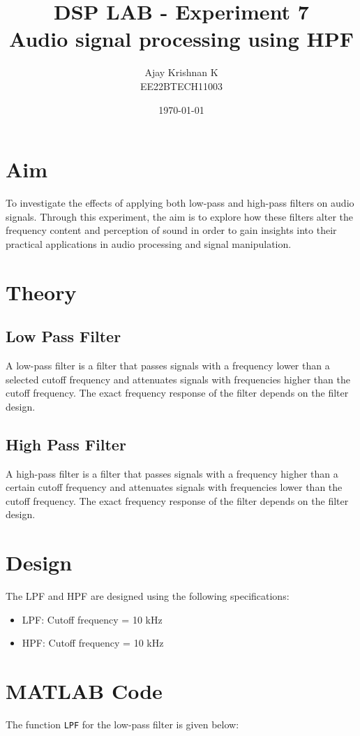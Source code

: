 \documentclass[a4paper,12pt]{article}
\title{\textbf{DSP LAB - Experiment 7} \\
        \vspace*{0.3em}
        \large{Audio signal processing using HPF} \\}
\author{Ajay Krishnan K \\  EE22BTECH11003}
\date{\today}
\begin{document}
\maketitle

\section*{Aim}
To investigate the effects of applying both low-pass and high-pass
filters on audio signals. Through this experiment, the aim is to
explore how these filters alter the frequency content
and perception of sound in order to gain insights into their
practical applications in audio processing and signal manipulation.

\section*{Theory}
\subsection*{Low Pass Filter}
A low-pass filter is a filter that passes signals with a frequency lower than a selected cutoff frequency and attenuates signals with frequencies higher than the cutoff frequency. The exact frequency response of the filter depends on the filter design.

\subsection*{High Pass Filter}
A high-pass filter is a filter that passes signals with a frequency higher than a certain cutoff frequency and attenuates signals with frequencies lower than the cutoff frequency. The exact frequency response of the filter depends on the filter design.

\section*{Design}
The LPF and HPF are designed using the following specifications:
\begin{itemize}
    \item LPF: Cutoff frequency = 10 kHz
    \item HPF: Cutoff frequency = 10 kHz
\end{itemize}

\section*{MATLAB Code}
The function \texttt{LPF} for the low-pass filter is given below: 

\end{document}
